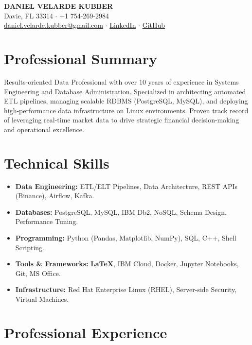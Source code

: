 \documentclass[11pt,a4paper,sans]{article}
\begin{document}
\begin{center}
    {\Huge \textbf{DANIEL VELARDE KUBBER}} \\ \vspace{4pt}
    Davie, FL 33314 $\cdot$ +1 754-269-2984 \\
    \href{mailto:daniel.velarde.kubber@gmail.com}{daniel.velarde.kubber@gmail.com} $\cdot$ 
    \href{https://linkedin.com/in/daniel-velarde-kubber-027a8951/}{LinkedIn} $\cdot$ 
    \href{https://github.com/DanielVelarde/briefcase.git}{GitHub}
\end{center}

\section{Professional Summary}
Results-oriented Data Professional with over 10 years of experience in Systems Engineering and Database Administration. Specialized in architecting automated ETL pipelines, managing scalable RDBMS (PostgreSQL, MySQL), and deploying high-performance data infrastructure on Linux environments. Proven track record of leveraging real-time market data to drive strategic financial decision-making and operational excellence.

\section{Technical Skills}
\begin{itemize}
    \item \textbf{Data Engineering:} ETL/ELT Pipelines, Data Architecture, REST APIs (Binance), Airflow, Kafka.
    \item \textbf{Databases:} PostgreSQL, MySQL, IBM Db2, NoSQL, Schema Design, Performance Tuning.
    \item \textbf{Programming:} Python (Pandas, Matplotlib, NumPy), SQL, C++, Shell Scripting.
    \item \textbf{Tools \& Frameworks:} \textbf{LaTeX}, IBM Cloud, Docker, Jupyter Notebooks, Git, MS Office.
    \item \textbf{Infrastructure:} Red Hat Enterprise Linux (RHEL), Server-side Security, Virtual Machines.
\end{itemize}

\section{Professional Experience}
\end{document}
